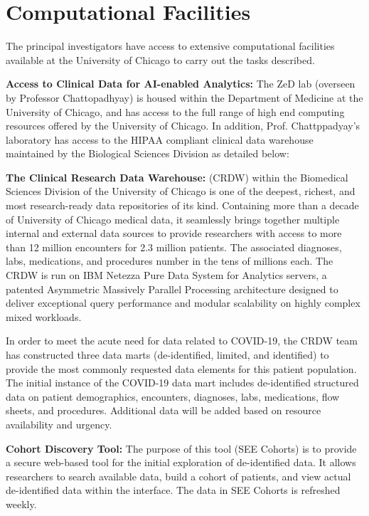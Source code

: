 \section*{Computational Facilities}


The principal investigators have access to extensive computational facilities available at the University of Chicago to carry out the tasks described.


\textbf{Access to Clinical Data for AI-enabled Analytics:} The ZeD lab (overseen by Professor Chattopadhyay) is housed within the Department of Medicine at the University of Chicago, and has access to the full range of high end computing resources offered by the University of Chicago. In addition, Prof. Chattppadyay's laboratory has access to the HIPAA compliant clinical data warehouse maintained by the Biological Sciences Division as detailed below:

\textbf{The Clinical Research Data Warehouse:} (CRDW) within the Biomedical Sciences Division of the University of Chicago is one of the deepest, richest, and most research-ready data repositories of its kind. Containing more than a decade of University of Chicago medical data, it seamlessly brings together multiple internal and external data sources to provide researchers with access to more than 12 million encounters for 2.3 million patients. The associated diagnoses, labs, medications, and procedures number in the tens of millions each. The CRDW is run on IBM Netezza Pure Data System for Analytics servers, a patented Asymmetric Massively Parallel Processing architecture designed to deliver exceptional query performance and modular scalability on highly complex mixed workloads.

In order to meet the acute need for data related to COVID-19, the CRDW team has constructed three data marts (de-identified, limited, and identified) to provide the most commonly requested data elements for this patient population. The initial instance of the COVID-19 data mart includes de-identified structured data on patient demographics, encounters, diagnoses, labs, medications, flow sheets, and procedures. Additional data will be added based on resource availability and urgency.

\textbf{Cohort Discovery Tool:} The purpose of this tool (SEE Cohorts) is to provide a secure web-based tool for the initial exploration of de-identified data. It allows researchers to search available data, build a cohort of patients, and view actual de-identified data within the interface. The data in SEE Cohorts is refreshed weekly.


